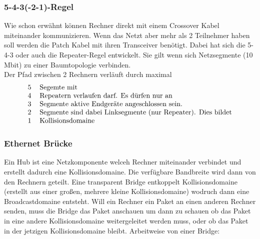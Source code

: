 \documentclass[a4paper,10pt]{scrartcl}
\begin{document}
        \subsubsection{5-4-3(-2-1)-Regel}
            Wie schon erwähnt können Rechner direkt mit einem Crossover Kabel miteinander kommunizieren. Wenn das Netzt aber mehr als 2 Teilnehmer haben soll werden die Patch Kabel mit 
            ihren Transceiver benötigt. Dabei hat sich die 5-4-3 oder auch die Repeater-Regel entwickelt. Sie gilt wenn sich Netzsegmente (10 Mbit) zu einer Baumtopologie verbinden. \\
            Der Pfad zwischen 2 Rechnern verläuft durch maximal
            \[
                \begin{tabular}{ll}
                    5 & Segemte mit \\
                    4 & Repeatern verlaufen darf. Es dürfen nur an \\
                    3 & Segmente aktive Endgeräte angeschlossen sein. \\
                    2 & Segmente sind dabei Linksegmente (nur Repeater). Dies bildet \\
                    1 & Kollisionsdomaine 
                \end{tabular}
            \]   

        \subsubsection{Ethernet Brücke}
            Ein Hub ist eine Netzkomponente welceh Rechner miteinander verbindet und erstellt dadurch eine Kollisionsdomaine. Die verfügbare Bandbreite wird dann von den Rechnern geteilt.
            Eine transparent Bridge entkoppelt Kollisionsdomaine (erstellt aus einer großen, mehrere kleine Kollisionsdomaine) wodruch dann eine Broadcastdomaine entsteht. Will ein Rechner 
            ein Paket an einen anderen Rechner senden, muss die Bridge das Paket anschauen um dann zu schauen ob das Paket in eine andere Kollisionsdomaine weitergeleitet werden muss, oder 
            ob das Paket in der jetzigen Kollisionsdomaine bleibt. Arbeitweise von einer Bridge:
            
\end{document}

